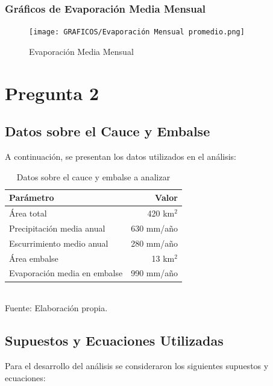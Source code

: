 \documentclass{article} %
\begin{document}
\subsubsection{Gráficos de Evaporación Media Mensual}

\begin{figure}[h!]
    \centering
    \texttt{[image: GRAFICOS/Evaporación Mensual promedio.png]}
    \caption{Evaporación Media Mensual}
    \label{fig:evaporacion_mensual}
\end{figure}


\newpage
\section{Pregunta 2}

\subsection{Datos sobre el Cauce y Embalse}

A continuación, se presentan los datos utilizados en el análisis:

\begin{table}[h]
    \centering
    \caption{Datos sobre el cauce y embalse a analizar}
    \vspace{0.2cm}
    \begin{tabular}{lr}
        \toprule
        \textbf{Parámetro} & \textbf{Valor} \\
        \midrule
        Área total & 420 km\(^2\) \\
        Precipitación media anual & 630 mm/año \\
        Escurrimiento medio anual & 280 mm/año \\
        Área embalse & 13 km\(^2\) \\
        Evaporación media en embalse & 990 mm/año \\
        \bottomrule
    \end{tabular}
    \vspace{0.2cm}
    \\Fuente: Elaboración propia.
\end{table}

\subsection{Supuestos y Ecuaciones Utilizadas}

Para el desarrollo del análisis se consideraron los siguientes supuestos y ecuaciones:
\end{document}
